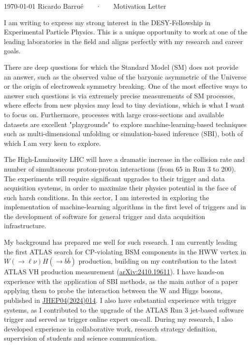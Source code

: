 \documentclass[11pt, a4paper]{awesome-cv}
\begin{document}
\makecvheader[R]

\makecvfooter
  {\today}
  {Ricardo Barrué ~~~·~~~ Motivation Letter}
  {}

\makelettertitle

\begin{cvletter}

I am writing to express my strong interest in the DESY-Fellowship in Experimental Particle Physics. This is a unique opportunity to work at one of the leading laboratories in the field and aligns perfectly with my research and career goals.

There are deep questions for which the Standard Model (SM) does not provide an answer, such as the observed value of the baryonic asymmetric of the Universe or the origin of electroweak symmetry breaking. One of the most effective ways to answer such questions is via extremely precise measurements of SM processes, where effects from new physics may lead to tiny deviations, which is what I want to focus on. Furthermore, processes with large cross-sections and available datasets are excellent "playgrounds" to explore machine-learning-based techniques such as multi-dimensional unfolding or simulation-based inference (SBI), both of which I am very keen to explore.

The High-Luminosity LHC will have a dramatic increase in the collision rate and number of simultaneous proton-proton interactions (from 65 in Run 3 to 200). The experiments will require significant upgrades to their trigger and data acquisition systems, in order to maximize their physics potential in the face of such harsh conditions. In this sector, I am interested in exploring the implementation of machine-learning algorithms in the first level of triggers and in the development of software for general trigger and data acquisition infrastructure.

My background has prepared me well for such research. I am currently leading the first ATLAS search for CP-violating BSM components in the HWW vertex in $W(\to \ell \nu)H(\to b\bar{b})$ production, building on my contribution to the latest ATLAS VH production measurement (\href{https://arxiv.org/abs/2410.19611}{arXiv:2410.19611}). I have hands-on experience with the application of SBI methods, as the main author of a paper applying them to probe the interaction between the W and Higgs bosons, published in \href{http://dx.doi.org/10.1007/JHEP04(2024)014}{JHEP04(2024)014}. I also have substantial experience with trigger systems, as I contributed to the upgrade of the ATLAS Run 3 jet-based software trigger and served as trigger online expert on-call. During my research, I also developed experience in collaborative work, research strategy definition, supervision of students and science communication.


\end{cvletter}
\end{document}
